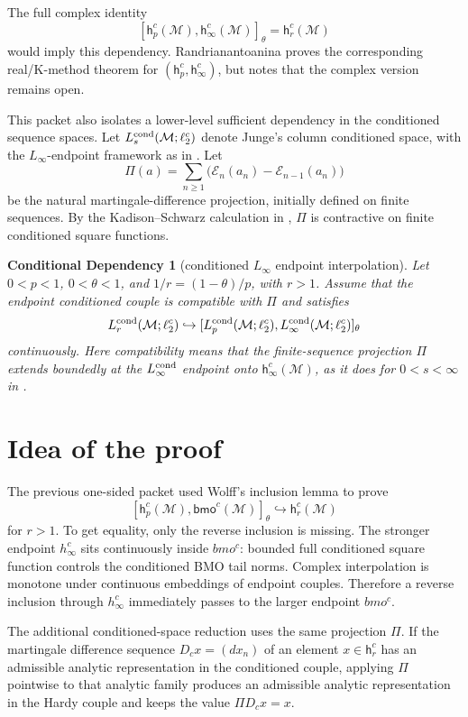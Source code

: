 \documentclass[11pt]{article}
\newcommand{\M}{\mathcal M}
\newcommand{\h}{\mathsf h}
\newcommand{\bmo}{\mathsf{bmo}}
\newtheorem{assumption}{Conditional Dependency}
\begin{document}
The full complex identity
\[
[\h_p^c(\M),\h_\infty^c(\M)]_\theta=\h_r^c(\M)
\]
would imply this dependency. Randrianantoanina \cite{Ran2022} proves the
corresponding real/K-method theorem for \((\h_p^c,\h_\infty^c)\), but notes
that the complex version remains open.

This packet also isolates a lower-level sufficient dependency in the
conditioned sequence spaces. Let \(L_s^{\rm cond}(\M;\ell_2^c)\) denote
Junge's column conditioned space, with the \(L_\infty\)-endpoint framework as
in \cite{Ran2022}. Let
\[
\Pi(a)=\sum_{n\ge1}\big(\mathcal E_n(a_n)-\mathcal E_{n-1}(a_n)\big)
\]
be the natural martingale-difference projection, initially defined on finite
sequences. By the Kadison--Schwarz calculation in \cite[Lemma 2.2]{Ran2021},
\(\Pi\) is contractive on finite conditioned square functions.

\begin{assumption}[conditioned \(L_\infty\) endpoint interpolation]
Let \(0<p<1\), \(0<\theta<1\), and \(1/r=(1-\theta)/p\), with \(r>1\). Assume
that the endpoint conditioned couple is compatible with \(\Pi\) and satisfies
\[
L_r^{\rm cond}(\M;\ell_2^c)\hookrightarrow
[L_p^{\rm cond}(\M;\ell_2^c),
 L_\infty^{\rm cond}(\M;\ell_2^c)]_\theta
\]
continuously. Here compatibility means that the finite-sequence projection
\(\Pi\) extends boundedly at the \(L_\infty^{\rm cond}\) endpoint onto
\(\h_\infty^c(\M)\), as it does for \(0<s<\infty\) in
\cite[Lemma 2.2]{Ran2021}.
\end{assumption}

\section*{Idea of the proof}

The previous one-sided packet used Wolff's inclusion lemma to prove
\[
[\h_p^c(\M),\bmo^c(\M)]_\theta\hookrightarrow \h_r^c(\M)
\]
for \(r>1\). To get equality, only the reverse inclusion is missing. The
stronger endpoint \(h_\infty^c\) sits continuously inside \(bmo^c\): bounded
full conditioned square function controls the conditioned BMO tail norms.
Complex interpolation is monotone under continuous embeddings of endpoint
couples. Therefore a reverse inclusion through \(h_\infty^c\) immediately
passes to the larger endpoint \(bmo^c\).

The additional conditioned-space reduction uses the same projection \(\Pi\).
If the martingale difference sequence \(D_cx=(dx_n)\) of an element
\(x\in\h_r^c\) has an admissible analytic representation in the conditioned
couple, applying \(\Pi\) pointwise to that analytic family produces an
admissible analytic representation in the Hardy couple and keeps the value
\(\Pi D_cx=x\).
\end{document}
